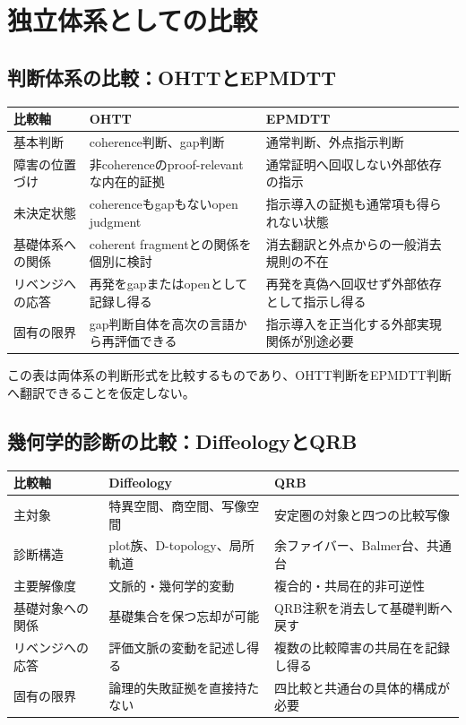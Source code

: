 \documentclass[a4paper,11pt]{ltjsarticle}
\theoremstyle{definition}
\theoremstyle{plain}
\begin{document}
\section{独立体系としての比較}

\subsection{判断体系の比較：OHTTとEPMDTT}

\begin{center}
\small
\begin{tabular}{@{}p{} p{} p{}@{}}
\toprule
比較軸 & OHTT & EPMDTT \\
\midrule
基本判断 & coherence判断、gap判断 & 通常判断、外点指示判断 \\
障害の位置づけ & 非coherenceのproof-relevantな内在的証拠 & 通常証明へ回収しない外部依存の指示 \\
未決定状態 & coherenceもgapもないopen judgment & 指示導入の証拠も通常項も得られない状態 \\
基礎体系への関係 & coherent fragmentとの関係を個別に検討 & 消去翻訳と外点からの一般消去規則の不在 \\
リベンジへの応答 & 再発をgapまたはopenとして記録し得る & 再発を真偽へ回収せず外部依存として指示し得る \\
固有の限界 & gap判断自体を高次の言語から再評価できる & 指示導入を正当化する外部実現関係が別途必要 \\
\bottomrule
\end{tabular}
\end{center}

この表は両体系の判断形式を比較するものであり、OHTT判断をEPMDTT判断へ翻訳できることを仮定しない。

\subsection{幾何学的診断の比較：DiffeologyとQRB}

\begin{center}
\small
\begin{tabular}{@{}p{} p{} p{}@{}}
\toprule
比較軸 & Diffeology & QRB \\
\midrule
主対象 & 特異空間、商空間、写像空間 & 安定圏の対象と四つの比較写像 \\
診断構造 & plot族、D-topology、局所軌道 & 余ファイバー、Balmer台、共通台 \\
主要解像度 & 文脈的・幾何学的変動 & 複合的・共局在的非可逆性 \\
基礎対象への関係 & 基礎集合を保つ忘却が可能 & QRB注釈を消去して基礎判断へ戻す \\
リベンジへの応答 & 評価文脈の変動を記述し得る & 複数の比較障害の共局在を記録し得る \\
固有の限界 & 論理的失敗証拠を直接持たない & 四比較と共通台の具体的構成が必要 \\
\bottomrule
\end{tabular}
\end{center}
\end{document}
